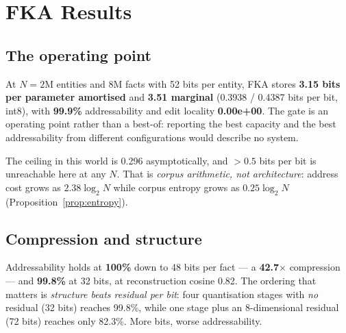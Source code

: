 \section{FKA Results}
\label{sec:fka}

\subsection{The operating point}

\begin{table}[t]\centering\small
\caption{The FKA operating point. Bits measured, not projected. Addressability and edit locality
carry the $N$ they were measured at, per the stale-constant rule (\S\ref{sec:method}).}
\label{tab:fka}

\end{table}

At $N = 2$M entities and 8M facts with 52 bits per entity, FKA stores \textbf{3.15 bits per
parameter amortised} and \textbf{3.51 marginal} (0.3938 / 0.4387 bits per bit, int8), with
\textbf{99.9\%} addressability and edit locality \textbf{0.00e+00}.
The gate is an operating point rather than a best-of: reporting the best capacity and the best
addressability from different configurations would describe no system.


The ceiling in this world is 0.296 asymptotically, and $>0.5$ bits per bit is unreachable here at
any $N$. That is \emph{corpus arithmetic, not architecture}: address cost grows as
$2.38\log_2 N$ while corpus entropy grows as $0.25\log_2 N$ (Proposition~\ref{prop:entropy}).

\subsection{Compression and structure}

Addressability holds at \textbf{100\%} down to 48 bits per fact --- a \textbf{42.7$\times$}
compression --- and \textbf{99.8\%} at 32 bits, at reconstruction cosine 0.82.
The ordering that matters is \emph{structure beats residual per bit}: four quantisation stages with
\emph{no} residual (32 bits) reaches 99.8\%, while one stage plus an 8-dimensional residual
(72 bits) reaches only 82.3\%. More bits, worse addressability.

